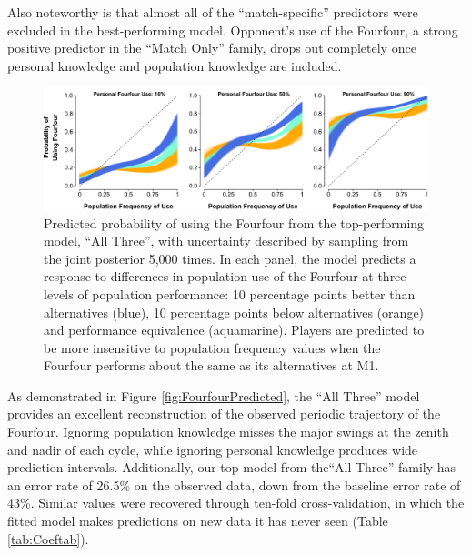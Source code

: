 Also noteworthy is that almost all of the ``match-specific'' predictors were excluded in the best-performing model.  Opponent's use of the Fourfour, a strong positive predictor in the ``Match Only'' family, drops out completely once personal knowledge and population knowledge are included.

\begin{figure}[tp]
\begin{center} 
\includegraphics[scale=0.8]{figures/gofirstmove/figmABCplots.pdf}
\caption{Predicted probability of using the Fourfour from the top-performing model, ``All Three'', with uncertainty described by sampling from the joint posterior 5,000 times.  In each panel, the model predicts a response to differences in population use of the Fourfour at three levels of population performance: 10 percentage points better than alternatives (blue), 10 percentage points below alternatives (orange) and performance equivalence (aquamarine).  Players are predicted to be more insensitive to population frequency values when the Fourfour performs about the same as its alternatives at M1.}
\label{fig:mABCplots}
\end{center}
\end{figure}

As demonstrated in Figure \ref{fig:FourfourPredicted}, the ``All Three'' model provides an excellent reconstruction of the observed periodic trajectory of the Fourfour.  Ignoring population knowledge misses the major swings at the zenith and nadir of each cycle, while ignoring personal knowledge produces wide prediction intervals.  Additionally, our top model from the``All Three'' family has an error rate of 26.5\% on the observed data, down from the baseline error rate of 43\%.  Similar values were recovered through ten-fold cross-validation, in which the fitted model makes predictions on new data it has never seen (Table \ref{tab:Coeftab}).
			

